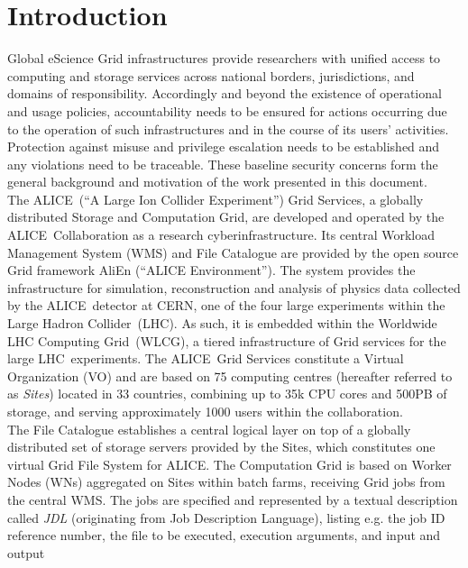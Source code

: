 \documentclass[10pt]{iopart}
\newcommand{\alice}{ALICE}
\newcommand{\alicee}{A Large Ion Collider Experiment}
\newcommand{\alien}{AliEn}
\newcommand{\aliene}{ALICE Environment}
\newcommand{\cern}{CERN}
\newcommand{\lhc}{LHC}
\newcommand{\lhce}{Large Hadron Collider}
\newcommand{\wlcg}{WLCG}
\newcommand{\wlcge}{Worldwide LHC Computing Grid}
\begin{document}
\section{Introduction}
Global eScience Grid infrastructures provide researchers with unified access
to computing and storage services across national borders, jurisdictions, and
domains of responsibility. Accordingly and beyond the existence of operational
and usage policies, accountability needs to be ensured for actions occurring 
due to the operation of such infrastructures and 
in the course of its users' activities. Protection against
misuse and privilege escalation needs to be established and any violations need
to be traceable. These baseline security concerns form
the general background and motivation of the work presented in this document.\\
The \alice\ (``\alicee'') Grid
Services, a
globally distributed Storage and Computation Grid, are developed and operated by 
the \alice\
Collaboration
as a research cyberinfrastructure. Its central 
Workload Management System (WMS) and File Catalogue are provided by the open
source Grid framework \alien
(``\aliene'').
The system provides the infrastructure for simulation, reconstruction and analysis of physics data collected by the \alice\
detector at \cern, one of the four large experiments within the \lhce\ (\lhc).
As such, it is embedded within the \wlcge\
(\wlcg)\ifthenelse{\boolean{bpublic}}{~\cite{wlcgano}}{~\cite{wlcg}}, a tiered
infrastructure of Grid services for the large \lhc\ experiments. The \alice\ Grid Services constitute a Virtual Organization (VO) 
and are based on 75 computing centres (hereafter
referred to as \textit{Sites}) located in 33 countries, 
combining up to 35k CPU cores and 500PB of storage, and serving approximately 1000
users within the collaboration.\\
The File Catalogue establishes a central logical layer on top
of a globally distributed set of storage servers provided by the Sites, which constitutes one
virtual Grid File System for \alice. The Computation Grid is based on Worker
Nodes (WNs) aggregated on Sites within batch farms,
receiving Grid jobs from the central WMS. The jobs
are specified and represented by a textual description called \textit{JDL} (originating from
Job Description Language), listing e.g. the job ID reference
number, the file to be executed, execution arguments, and input and output
\end{document}
